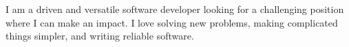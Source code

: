 
\begin{cvparagraph}

I am a driven and versatile software developer looking for a challenging position where I can
make an impact. I love solving new problems, making complicated things simpler, and writing
reliable software.
\end{cvparagraph}
